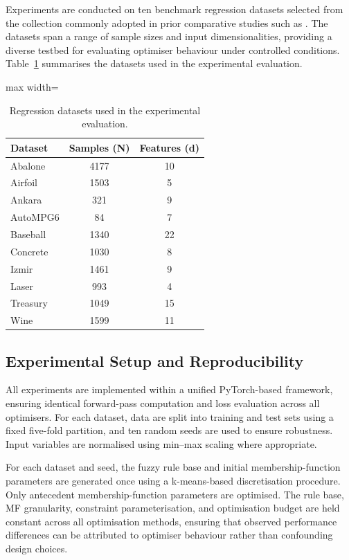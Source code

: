 \documentclass[a4paper,12pt,oneside]{article}
\begin{document}
Experiments are conducted on ten benchmark regression datasets selected from
the collection commonly adopted in prior comparative studies such as
\cite{zhou2023stochastic}.
The datasets span a range of sample sizes and input dimensionalities, providing
a diverse testbed for evaluating optimiser behaviour under controlled
conditions.
Table~\ref{tab:datasets} summarises the datasets used in the experimental
evaluation.

\begin{table}[t]
\centering
\caption{Regression datasets used in the experimental evaluation.}
\label{tab:datasets}
\begin{adjustbox}{max width=\linewidth}
\begin{tabular}{lcc}
\toprule
\textbf{Dataset} & \textbf{Samples (N)} & \textbf{Features (d)} \\
\midrule
Abalone   & 4177 & 10 \\
Airfoil  & 1503 & 5  \\
Ankara   & 321  & 9  \\
AutoMPG6 & 84   & 7  \\
Baseball & 1340 & 22 \\
Concrete & 1030 & 8  \\
Izmir    & 1461 & 9  \\
Laser    & 993  & 4  \\
Treasury & 1049 & 15 \\
Wine     & 1599 & 11 \\
\bottomrule
\end{tabular}
\end{adjustbox}
\end{table}

\subsection{Experimental Setup and Reproducibility}

All experiments are implemented within a unified PyTorch-based framework,
ensuring identical forward-pass computation and loss evaluation across all
optimisers.
For each dataset, data are split into training and test sets using a fixed
five-fold partition, and ten random seeds are used to ensure robustness.
Input variables are normalised using min--max scaling where appropriate.

For each dataset and seed, the fuzzy rule base and initial membership-function
parameters are generated once using a k-means-based discretisation procedure.
Only antecedent membership-function parameters are optimised.
The rule base, MF granularity, constraint parameterisation, and optimisation
budget are held constant across all optimisation methods, ensuring that
observed performance differences can be attributed to optimiser behaviour
rather than confounding design choices.
\end{document}
